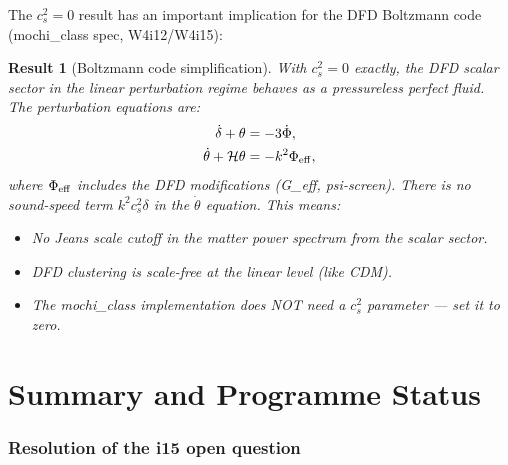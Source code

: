 \documentclass[11pt]{article}
\newtheorem{result}{Result}
\begin{document}
The $c_s^2 = 0$ result has an important implication for the DFD Boltzmann code (mochi\_class spec, W4i12/W4i15):

\begin{result}[Boltzmann code simplification]
With $c_s^2 = 0$ exactly, the DFD scalar sector in the linear perturbation regime behaves as a pressureless perfect fluid. The perturbation equations are:
\begin{align}
\dot\delta + \theta &= -3\dot\Phi, \\
\dot\theta + \mathcal{H}\theta &= -k^2\Phi_{\rm eff},
\end{align}
where $\Phi_{\rm eff}$ includes the DFD modifications (G\_eff, psi-screen). There is no sound-speed term $k^2 c_s^2 \delta$ in the $\dot\theta$ equation. This means:
\begin{itemize}[nosep]
\item No Jeans scale cutoff in the matter power spectrum from the scalar sector.
\item DFD clustering is scale-free at the linear level (like CDM).
\item The mochi\_class implementation does NOT need a $c_s^2$ parameter --- set it to zero.
\end{itemize}
\end{result}


\part{Summary and Programme Status}
\label{part:summary}

\section{Resolution of the i15 open question}
\end{document}
